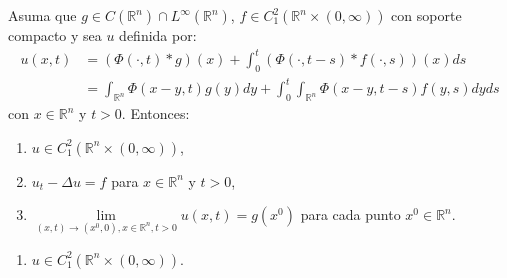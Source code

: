 \begin{homeworkProblem}
  \begin{teorema}
    Asuma que $g\in C(\mathbb{R}^{n})\cap L^{\infty}(\mathbb{R}^{n})$, $f\in C^{2}_{1}(\mathbb{R}^{n}\times (0,\infty))$ con soporte compacto y sea $u$ definida por:
    \begin{align*}
      u(x,t)&=(\Phi(\cdot,t)*g)(x)+\int_{0}^{t}(\Phi(\cdot,t-s)*f(\cdot,s))(x)ds\\
      &=\int_{\mathbb{R}^{n}}\Phi(x-y,t)g(y)dy+\int_{0}^{t}\int_{\mathbb{R}^{n}}\Phi(x-y,t-s)f(y,s)dyds
    \end{align*}
    con $x\in\mathbb{R}^{n}$ y $t>0$. Entonces:
    \begin{enumerate}
      \item $u\in C^{2}_{1}(\mathbb{R}^{n}\times (0,\infty))$,
      \item $u_t-\Delta u=f$ para $x\in\mathbb{R}^{n}$ y $t>0$,
      \item $\underset{(x,t)\rightarrow(x^0,0),x\in\mathbb{R}^{n},t>0}{\lim}u(x,t)=g(x^0)$ para cada punto $x^0\in\mathbb{R}^{n}$.
    \end{enumerate}
  \end{teorema}
  \begin{solucion}
    \begin{enumerate}
      \item $u\in C^{2}_{1}(\mathbb{R}^{n}\times (0,\infty))$.
    \end{enumerate}
  \end{solucion}
\end{homeworkProblem}
